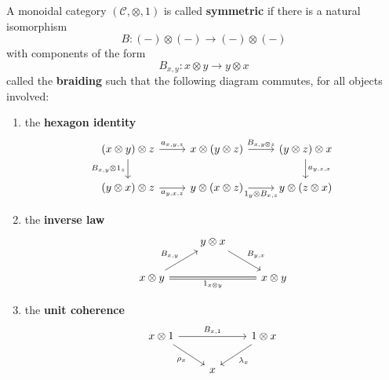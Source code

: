 \begin{definition}
  A monoidal category $ (\mathcal{C}, \otimes, 1) $ is called \textbf{symmetric} if there is a natural isomorphism
  \begin{equation}
    B: (-) \otimes (-) \to (-) \otimes (-)
    \label{eq:braiding}
  \end{equation}
  with components of the form
  \begin{equation}
    B_{x,y}: x \otimes y \to y \otimes x
  \end{equation}
  called the \textbf{braiding} such that the following diagram commutes, for all objects involved:
  \begin{enumerate}[label=(\roman*)]
    \item the \textbf{hexagon identity}
      \[\begin{tikzcd}
	      {(x \otimes y) \otimes z} & {x\otimes (y\otimes z)} & {(y\otimes z) \otimes x} \\
	      {(y\otimes x)\otimes z} & {y \otimes (x\otimes z)} & {y \otimes (z \otimes x)}
	      \arrow["{B_{x,y}\otimes 1_z}"', from=1-1, to=2-1]
	      \arrow["{a_{x,y,z}}", from=1-1, to=1-2]
	      \arrow["{B_{x,y\otimes z}}", from=1-2, to=1-3]
	      \arrow["{a_{y,z,x}}", from=1-3, to=2-3]
	      \arrow["{a_{y,x,z}}"', from=2-1, to=2-2]
	      \arrow["{1_y \otimes B_{x,z}}"', from=2-2, to=2-3]
      \end{tikzcd}\]
    \item the \textbf{inverse law}
      \[\begin{tikzcd}
	& {y\otimes x} \\
	      {x \otimes y} && {x \otimes y}
	      \arrow["{1_{x\otimes y}}"', Rightarrow, no head, from=2-1, to=2-3]
	      \arrow["{B_{x,y}}", from=2-1, to=1-2]
	      \arrow["{B_{y,x}}", from=1-2, to=2-3]
      \end{tikzcd}\]

    \item the \textbf{unit coherence}
      \[\begin{tikzcd}
	      {x\otimes 1} && {1 \otimes x} \\
	                   & x
	                   \arrow["{B_{x, 1}}", from=1-1, to=1-3]
	                   \arrow["{\lambda_x}", from=1-3, to=2-2]
	                   \arrow["{\rho_x}"', from=1-1, to=2-2]
      \end{tikzcd}\]
  \end{enumerate}
\end{definition}

